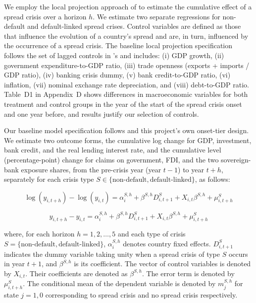 \documentclass[12pt]{article}
\begin{document}
We employ the local projection approach of \citet{jorda2005estimation} to estimate the
cumulative effect of a spread crisis over a horizon $h$. We estimate two
separate regressions for non-default and default-linked spread crises.
Control variables are defined as those that influence the evolution of a
country's spread and are, in turn, influenced by the occurrence of a
spread crisis. The baseline local projection specification follows the
set of lagged controls in \citet{asonuma2024costs}'s and includes: (i) GDP
growth, (ii) government expenditure-to-GDP ratio, (iii) trade openness
(exports + imports / GDP ratio), (iv) banking crisis dummy, (v) bank
credit-to-GDP ratio, (vi) inflation, (vii) nominal exchange rate
depreciation, and (viii) debt-to-GDP ratio. Table~D1 in Appendix~D shows
differences in macroeconomic variables for both treatment and control
groups in the year of the start of the spread crisis onset and one year
before, and results justify our selection of controls.

Our baseline model specification follows \citet{jorda2016time} and
this project's own onset-tier design. We estimate two outcome forms, the
cumulative log change for GDP, investment, bank credit, and the real
lending interest rate, and the cumulative level (percentage-point) change
for claims on government, FDI, and the two sovereign-bank exposure
shares, from the pre-crisis year (year $t-1$) to year $t+h$, separately
for each crisis type $S \in \{\text{non-default}, \text{default-linked}\}$,
as follows:

\begin{equation}
\label{eq:1}
\log(y_{i,t+h}) - \log(y_{i,t}) = \alpha_i^{S,h} + \beta^{S,h} D_{i,t+1}^{S}
  + X_{i,t}\beta^{S,h} + \mu_{i,t+h}^{S}
\end{equation}

\begin{equation}
\label{eq:2}
y_{i,t+h} - y_{i,t} = \alpha_i^{S,h} + \beta^{S,h} D_{i,t+1}^{S}
  + X_{i,t}\beta^{S,h} + \mu_{i,t+h}^{S}
\end{equation}

\noindent where, for each horizon $h=1,2,\dots,5$ and each type of crisis $S=\{\text{non-default}, \text{default-linked}\}$, $\alpha_i^{S,h}$
denotes country fixed effects. $D_{i,t+1}^S$ indicates the dummy variable
taking unity when a spread crisis of type $S$ occurs in year $t+1$, and
$\beta^{S,h}$ is its coefficient. The vector of control variables is
denoted by $X_{i,t}$. Their coefficients are denoted as $\beta^{S,h}$.
The error term is denoted by $\mu_{i,t+h}^S$. The conditional mean of the
dependent variable is denoted by $m_j^{S,h}$ for state $j=1,0$
corresponding to spread crisis and no spread crisis respectively.
\end{document}
